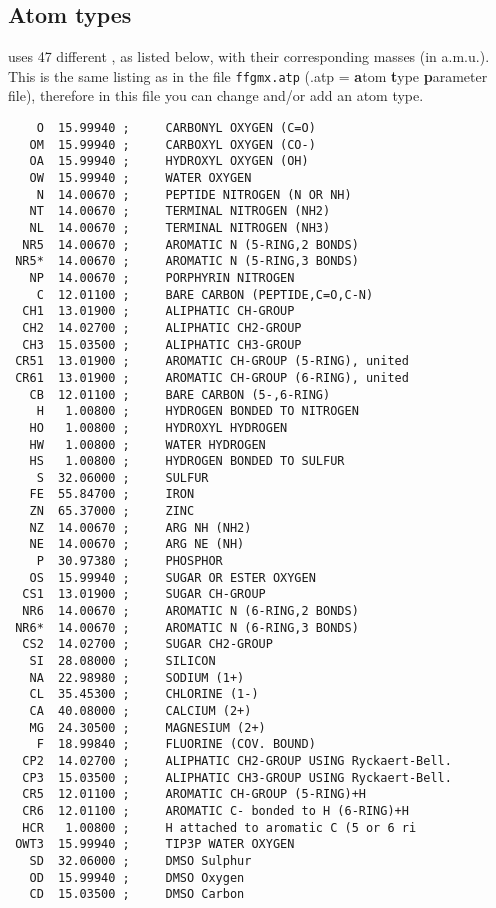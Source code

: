 \subsection{Atom types}
\label{subsec:atomtype}
{\gromacs} uses 47 different , 
as listed below, with their
corresponding masses (in a.m.u.). This is the same listing as in the
file \verb'ffgmx.atp' (.atp = {\bf a}tom {\bf t}ype {\bf p}arameter
file), therefore in this file you can change and/or add an atom type.
{\small 
\begin{verbatim}
    O  15.99940 ;     CARBONYL OXYGEN (C=O)              
   OM  15.99940 ;     CARBOXYL OXYGEN (CO-)              
   OA  15.99940 ;     HYDROXYL OXYGEN (OH)               
   OW  15.99940 ;     WATER OXYGEN                       
    N  14.00670 ;     PEPTIDE NITROGEN (N OR NH)         
   NT  14.00670 ;     TERMINAL NITROGEN (NH2)            
   NL  14.00670 ;     TERMINAL NITROGEN (NH3)            
  NR5  14.00670 ;     AROMATIC N (5-RING,2 BONDS)        
 NR5*  14.00670 ;     AROMATIC N (5-RING,3 BONDS)        
   NP  14.00670 ;     PORPHYRIN NITROGEN                 
    C  12.01100 ;     BARE CARBON (PEPTIDE,C=O,C-N)      
  CH1  13.01900 ;     ALIPHATIC CH-GROUP                 
  CH2  14.02700 ;     ALIPHATIC CH2-GROUP                
  CH3  15.03500 ;     ALIPHATIC CH3-GROUP                
 CR51  13.01900 ;     AROMATIC CH-GROUP (5-RING), united 
 CR61  13.01900 ;     AROMATIC CH-GROUP (6-RING), united 
   CB  12.01100 ;     BARE CARBON (5-,6-RING)            
    H   1.00800 ;     HYDROGEN BONDED TO NITROGEN        
   HO   1.00800 ;     HYDROXYL HYDROGEN                  
   HW   1.00800 ;     WATER HYDROGEN                     
   HS   1.00800 ;     HYDROGEN BONDED TO SULFUR          
    S  32.06000 ;     SULFUR                             
   FE  55.84700 ;     IRON                               
   ZN  65.37000 ;     ZINC                               
   NZ  14.00670 ;     ARG NH (NH2)                       
   NE  14.00670 ;     ARG NE (NH)                        
    P  30.97380 ;     PHOSPHOR                           
   OS  15.99940 ;     SUGAR OR ESTER OXYGEN              
  CS1  13.01900 ;     SUGAR CH-GROUP                     
  NR6  14.00670 ;     AROMATIC N (6-RING,2 BONDS)        
 NR6*  14.00670 ;     AROMATIC N (6-RING,3 BONDS)        
  CS2  14.02700 ;     SUGAR CH2-GROUP                    
   SI  28.08000 ;     SILICON                            
   NA  22.98980 ;     SODIUM (1+)                        
   CL  35.45300 ;     CHLORINE (1-)                      
   CA  40.08000 ;     CALCIUM (2+)                       
   MG  24.30500 ;     MAGNESIUM (2+)                     
    F  18.99840 ;     FLUORINE (COV. BOUND)              
  CP2  14.02700 ;     ALIPHATIC CH2-GROUP USING Ryckaert-Bell.
  CP3  15.03500 ;     ALIPHATIC CH3-GROUP USING Ryckaert-Bell.
  CR5  12.01100 ;     AROMATIC CH-GROUP (5-RING)+H       
  CR6  12.01100 ;     AROMATIC C- bonded to H (6-RING)+H 
  HCR   1.00800 ;     H attached to aromatic C (5 or 6 ri
 OWT3  15.99940 ;     TIP3P WATER OXYGEN                 
   SD  32.06000 ;     DMSO Sulphur                       
   OD  15.99940 ;     DMSO Oxygen                        
   CD  15.03500 ;     DMSO Carbon                        
\end{verbatim}}
